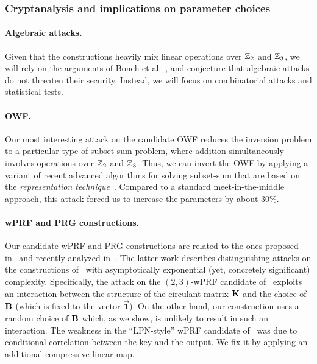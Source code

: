\begin{itemize}
\end{itemize}

\subsubsection{Cryptanalysis and implications on parameter choices}

\paragraph{Algebraic attacks.}
Given that the constructions heavily mix linear operations over $\mathbb{Z}_2$ and $\mathbb{Z}_3$,
we will rely on the arguments of Boneh et al.~\cite{boneh2018-darkmatter},
and conjecture that algebraic attacks do not threaten their security.
Instead, we will focus on combinatorial attacks and statistical tests.

\paragraph{OWF.}
Our most interesting attack on the
candidate OWF reduces the inversion problem to a particular type of subset-sum problem,
where addition simultaneously involves operations over $\mathbb{Z}_2$ and $\mathbb{Z}_3$.
Thus, we can invert the OWF by applying a variant of recent advanced algorithms
for solving subset-sum that are based on the
\emph{representation technique}~\cite{Howgrave-GrahamJ10,BeckerCJ11,BonnetainBSS20}.
Compared to a standard meet-in-the-middle approach,
this attack forced us to increase the parameters by about $30\%$.

\paragraph{wPRF and PRG constructions.}
Our candidate wPRF and PRG constructions are related to the ones proposed in~\cite{boneh2018-darkmatter}
and recently analyzed in~\cite{cheon2020-adventures}.
The latter work describes distinguishing attacks on the constructions of~\cite{boneh2018-darkmatter}
with asymptotically exponential (yet, concretely significant) complexity.
Specifically, the attack on the $(2,3)$-wPRF candidate of~\cite{boneh2018-darkmatter} exploits an interaction
between the structure of the circulant matrix $\mat{K}$ and the choice of $\mat{B}$
(which is fixed to the vector $\vec{\textbf{1}}$).
On the other hand, our construction uses a random choice of $\mat{B}$ which, as we show, is
unlikely to result in such an interaction.
The weakness in the ``LPN-style'' wPRF candidate of~\cite{boneh2018-darkmatter}
was due to conditional correlation between the key and the output. We fix it by applying an additional compressive linear map.

